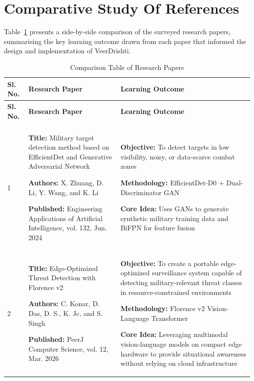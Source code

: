 \endgroup
\label{end:literature-review}
\clearpage
\section{Comparative Study Of References}\label{sec:comparison}
\renewcommand{\arraystretch}{1.35}
\setlength{\tabcolsep}{5pt}

Table~\ref{tab:comparison} presents a side-by-side comparison of the surveyed research
papers, summarising the key learning outcome drawn from each paper that informed the design
and implementation of VeerDrishti.

\begin{longtable}{|>{\centering\arraybackslash}p{1.2cm}|p{6.3cm}|p{6.3cm}|}
  \caption{Comparison Table of Research Papers}\label{tab:comparison} \\
  \hline
  \textbf{Sl. No.} & \textbf{Research Paper} & \textbf{Learning Outcome} \\
  \hline
  \endfirsthead
  \hline
  \textbf{Sl. No.} & \textbf{Research Paper} & \textbf{Learning Outcome} \\
  \hline
  \endhead
  \hline
  \multicolumn{3}{|r|}{\textit{Continued on next page}} \\
  \hline
  \endfoot
  \hline
  \endlastfoot

  1 &
  \textbf{Title:} Military target detection method based on EfficientDet and Generative Adversarial Network \par
  \textbf{Authors:} X. Zhuang, D. Li, Y. Wang, and K. Li \par
  \textbf{Published:} Engineering Applications of Artificial Intelligence, vol. 132, Jun. 2024 &
  \textbf{Objective:} To detect targets in low visibility, noisy, or data-scarce combat zones \par
  \textbf{Methodology:} EfficientDet-D0 + Dual-Discriminator GAN \par
  \textbf{Core Idea:} Uses GANs to generate synthetic military training data and BiFPN for feature fusion \\
  \hline

  2 &
  \textbf{Title:} Edge-Optimized Threat Detection with Florence v2 \par
  \textbf{Authors:} C. Konar, D. Das, D. S., K. Jc, and S. Singh \par
  \textbf{Published:} PeerJ Computer Science, vol. 12, Mar. 2026 &
  \textbf{Objective:} To create a portable edge-optimized surveillance system capable of detecting military-relevant threat classes in resource-constrained environments \par
  \textbf{Methodology:} Florence v2 Vision-Language Transformer \par
  \textbf{Core Idea:} Leveraging multimodal vision-language models on compact edge hardware to provide situational awareness without relying on cloud infrastructure \\
  \hline


\end{longtable}
